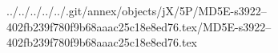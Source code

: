 ../../../../../.git/annex/objects/jX/5P/MD5E-s3922--402fb239f780f9b68aaac25c18e8ed76.tex/MD5E-s3922--402fb239f780f9b68aaac25c18e8ed76.tex